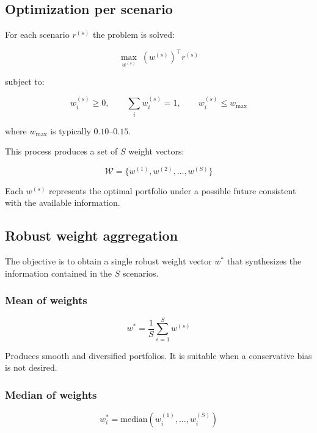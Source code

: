 \documentclass[12pt]{article}
\begin{document}
\subsection{Optimization per scenario}

For each scenario $r^{(s)}$ the problem is solved:



\[
\max_{w^{(s)}} \; (w^{(s)})^\top r^{(s)}
\]



subject to:



\[
w^{(s)}_i \ge 0, \qquad \sum_i w^{(s)}_i = 1, \qquad w^{(s)}_i \le w_{\max}
\]



where $w_{\max}$ is typically $0.10$–$0.15$.

This process produces a set of $S$ weight vectors:



\[
\mathcal{W} = \{ w^{(1)}, w^{(2)}, \dots, w^{(S)} \}
\]



Each $w^{(s)}$ represents the optimal portfolio under a possible future consistent with the available information.

\subsection{Robust weight aggregation}

The objective is to obtain a single robust weight vector $w^\ast$ that synthesizes the information contained in the $S$ scenarios.

\subsubsection{Mean of weights}



\[
w^\ast = \frac{1}{S} \sum_{s=1}^S w^{(s)}
\]



Produces smooth and diversified portfolios.  
It is suitable when a conservative bias is not desired.

\subsubsection{Median of weights}



\[
w^\ast_i = \text{median}\left( w^{(1)}_i, \dots, w^{(S)}_i \right)
\]
\end{document}
